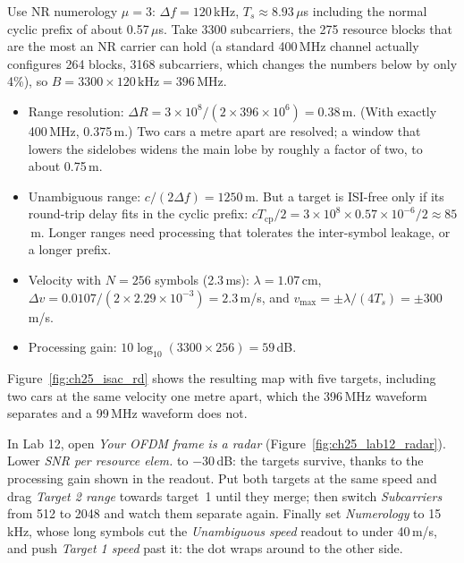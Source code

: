 \begin{worked}
Use NR numerology $\mu=3$: $\Delta f=120$\,kHz, $T_s\approx8.93\,\mu$s including the normal cyclic
prefix of about 0.57\,$\mu$s. Take 3300 subcarriers, the 275 resource blocks that are the most an NR
carrier can hold (a standard 400\,MHz channel actually configures 264 blocks, 3168 subcarriers, which
changes the numbers below by only 4\%), so $B=3300\times120\,\text{kHz}=396$\,MHz.
\begin{itemize}
\item Range resolution: $\Delta R=3\times10^8/(2\times396\times10^6)=0.38$\,m. (With exactly
400\,MHz, 0.375\,m.) Two cars a metre apart are resolved; a window that lowers the sidelobes widens
the main lobe by roughly a factor of two, to about 0.75\,m.
\item Unambiguous range: $c/(2\Delta f)=1250$\,m. But a target is ISI-free only if its round-trip delay
fits in the cyclic prefix: $cT_{\text{cp}}/2=3\times10^8\times0.57\times10^{-6}/2\approx85$\,m. Longer
ranges need processing that tolerates the inter-symbol leakage, or a longer prefix.
\item Velocity with $N=256$ symbols (2.3\,ms): $\lambda=1.07$\,cm,
$\Delta v=0.0107/(2\times2.29\times10^{-3})=2.3$\,m/s, and $v_{\max}=\pm\lambda/(4T_s)=\pm300$\,m/s.
\item Processing gain: $10\log_{10}(3300\times256)=59$\,dB.
\end{itemize}
Figure~\ref{fig:ch25_isac_rd} shows the resulting map with five targets, including two cars at the
same velocity one metre apart, which the 396\,MHz waveform separates and a 99\,MHz waveform does not.
\end{worked}


\begin{tryit}
In Lab 12, open \emph{Your OFDM frame is a radar} (Figure~\ref{fig:ch25_lab12_radar}). Lower
\emph{SNR per resource elem.} to $-30$\,dB: the targets survive, thanks to the processing gain shown
in the readout. Put both targets at the same speed and drag \emph{Target 2 range} towards target~1
until they merge; then switch \emph{Subcarriers} from 512 to 2048 and watch them separate again.
Finally set \emph{Numerology} to 15\,kHz, whose long symbols cut the \emph{Unambiguous speed}
readout to under 40\,m/s, and push \emph{Target 1 speed} past it: the dot wraps around to the other
side.
\end{tryit}

